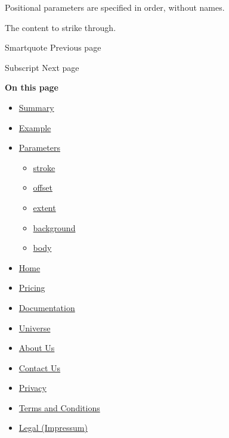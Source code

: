 \label{parameters-body-positional-tooltip}
Positional parameters are specified in order, without names.

The content to strike through.

\href{/docs/reference/text/smartquote/}{\pandocbounded{}}

{ Smartquote } { Previous page }

\href{/docs/reference/text/sub/}{\pandocbounded{}}

{ Subscript } { Next page }

\textbf{On this page}

\begin{itemize}
\tightlist
\item
  \hyperref[summary]{Summary}
\item
  \hyperref[example]{Example}
\item
  \hyperref[parameters]{Parameters}

  \begin{itemize}
  \tightlist
  \item
    \hyperref[parameters-stroke]{stroke}
  \item
    \hyperref[parameters-offset]{offset}
  \item
    \hyperref[parameters-extent]{extent}
  \item
    \hyperref[parameters-background]{background}
  \item
    \hyperref[parameters-body]{body}
  \end{itemize}
\end{itemize}

\begin{itemize}
\tightlist
\item
  \href{/}{Home}
\item
  \href{/pricing/}{Pricing}
\item
  \href{/docs/}{Documentation}
\item
  \href{/universe/}{Universe}
\item
  \href{/about/}{About Us}
\item
  \href{/contact/}{Contact Us}
\item
  \href{/privacy/}{Privacy}
\item
  \href{https://typst.app/terms}{Terms and Conditions}
\item
  \href{/legal/}{Legal (Impressum)}
\end{itemize}

